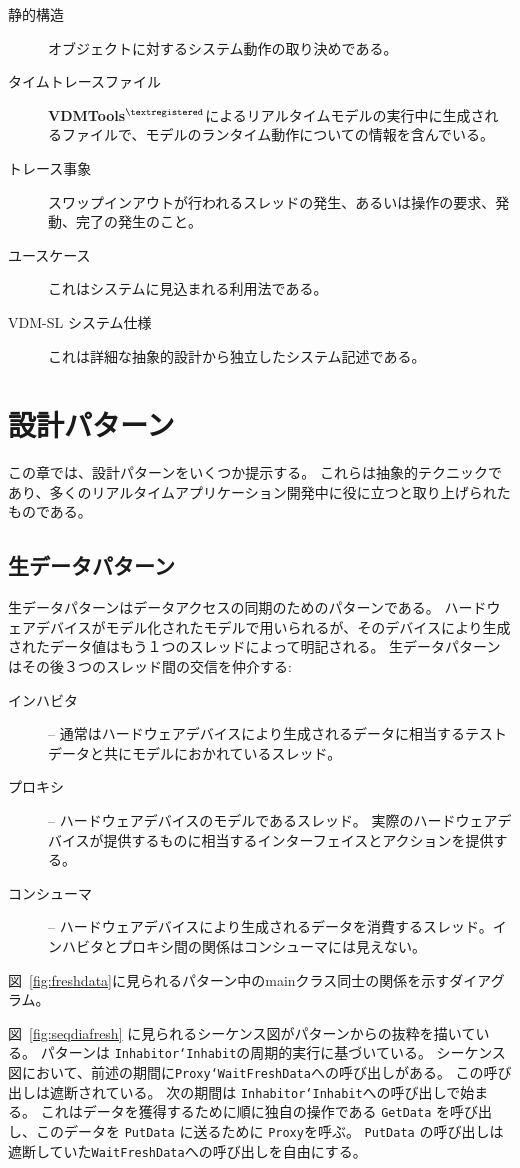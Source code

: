 \documentclass[\pformat,12pt]{jreport}
\newcommand{\vdmtools}{\textbf{VDMTools}$^{\mathbf{{\textregistered}}}$}
\begin{document}
\begin{description}
\item[静的構造] オブジェクトに対するシステム動作の取り決めである。
\item[タイムトレースファイル]  \vdmtools によるリアルタイムモデルの実行中に生成されるファイルで、モデルのランタイム動作についての情報を含んでいる。
\item[トレース事象] スワップインアウトが行われるスレッドの発生、あるいは操作の要求、発動、完了の発生のこと。
\item[ユースケース] これはシステムに見込まれる利用法である。
\item[VDM-SL システム仕様] これは詳細な抽象的設計から独立したシステム記述である。
\end{description}


\chapter{設計パターン}\label{app:patterns}

この章では、設計パターンをいくつか提示する。
これらは抽象的テクニックであり、多くのリアルタイムアプリケーション開発中に役に立つと取り上げられたものである。

\section{生データパターン}

生データパターンはデータアクセスの同期のためのパターンである。
ハードウェアデバイスがモデル化されたモデルで用いられるが、そのデバイスにより生成されたデータ値はもう１つのスレッドによって明記される。
生データパターンはその後３つのスレッド間の交信を仲介する:

\begin{description}
\item[インハビタ] -- 通常はハードウェアデバイスにより生成されるデータに相当するテストデータと共にモデルにおかれているスレッド。
\item[プロキシ] -- ハードウェアデバイスのモデルであるスレッド。
実際のハードウェアデバイスが提供するものに相当するインターフェイスとアクションを提供する。
\item[コンシューマ] -- ハードウェアデバイスにより生成されるデータを消費するスレッド。インハビタとプロキシ間の関係はコンシューマには見えない。
\end{description}

 図~\ref{fig:freshdata}に見られるパターン中のmainクラス同士の関係を示すダイアグラム。

 図~\ref{fig:seqdiafresh} に見られるシーケンス図がパターンからの抜粋を描いている。
パターンは \texttt{Inhabitor`Inhabit}の周期的実行に基づいている。
シーケンス図において、前述の期間に\texttt{Proxy`WaitFreshData}への呼び出しがある。
この呼び出しは遮断されている。
次の期間は \texttt{Inhabitor`Inhabit}への呼び出しで始まる。
これはデータを獲得するために順に独自の操作である \texttt{GetData} を呼び出し、このデータを \texttt{PutData} に送るために \texttt{Proxy}を呼ぶ。 
\texttt{PutData} の呼び出しは 遮断していた\texttt{WaitFreshData}への呼び出しを自由にする。
\end{document}
